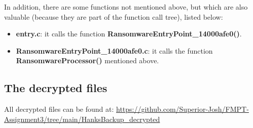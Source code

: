 \documentclass[11pt]{article}
\begin{document}
In addition, there are some functions not mentioned above, but which are also valuable (because they are part of the function call tree), listed below:

\begin{itemize}
    \item \textbf{entry.c}: it calls the function \textbf{RansomwareEntryPoint\_14000afe0()}.

    \item \textbf{RansomwareEntryPoint\_14000afe0.c}: it calls the function \textbf{RansomwareProcessor()} mentioned above.

\end{itemize}

\subsection{The decrypted files}
All decrypted files can be found at: \url{https://github.com/Superior-Josh/FMPT-Assignment3/tree/main/HanksBackup_decrypted}


\end{document}
